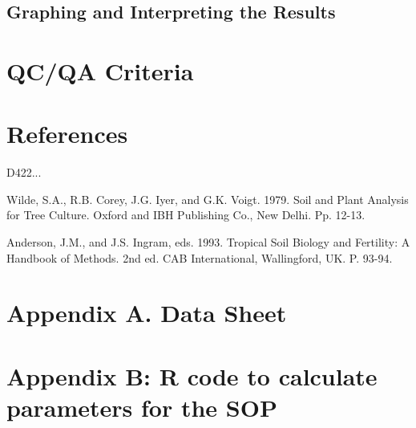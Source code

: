 \documentclass[12pt]{../SOP4_alpha}\usepackage[]{graphicx}\usepackage[]{xcolor}
\begin{document}
\subsection{Graphing and Interpreting the Results}

\section{QC/QA Criteria}

\section{References}

\NP D422...

\NP Wilde, S.A., R.B. Corey, J.G. Iyer, and G.K. Voigt.  1979.  Soil and Plant Analysis for Tree Culture.  Oxford and IBH Publishing Co., New Delhi.  Pp. 12-13.

\NP Anderson, J.M., and J.S. Ingram, eds.  1993.  Tropical Soil Biology and Fertility:  A Handbook of Methods. 2nd ed.  CAB International, Wallingford, UK.  P. 93-94.

\section{Appendix A. Data Sheet}




\newpage
\section{Appendix B: R code to calculate parameters for the SOP}

% 	
\end{document}

